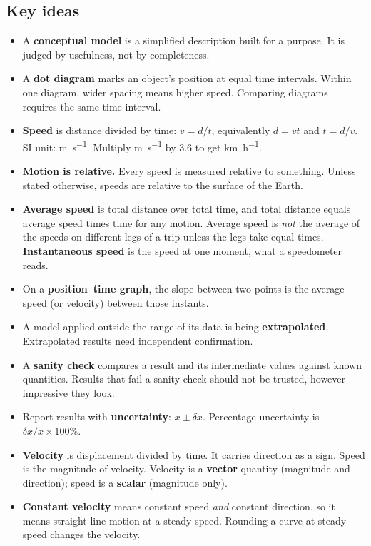 \documentclass[11pt,twoside,openany]{book}
\newcounter{check}[chapter]
\begin{document}
\subsection*{Key ideas}
\begin{itemize}
  \item A \textbf{conceptual model} is a simplified description built for a purpose. It is judged by usefulness, not by completeness.
  \item A \textbf{dot diagram} marks an object's position at equal time intervals. Within one diagram, wider spacing means higher speed. Comparing diagrams requires the same time interval.
  \item \textbf{Speed} is distance divided by time: $v = d/t$, equivalently $d = vt$ and $t = d/v$. SI unit: \si{\metre\per\second}. Multiply \si{\metre\per\second} by \num{3.6} to get \si{\kilo\metre\per\hour}.
  \item \textbf{Motion is relative.} Every speed is measured relative to something. Unless stated otherwise, speeds are relative to the surface of the Earth.
  \item \textbf{Average speed} is total distance over total time, and total distance equals average speed times time for any motion. Average speed is \emph{not} the average of the speeds on different legs of a trip unless the legs take equal times. \textbf{Instantaneous speed} is the speed at one moment, what a speedometer reads.
  \item On a \textbf{position--time graph}, the slope between two points is the average speed (or velocity) between those instants.
  \item A model applied outside the range of its data is being \textbf{extrapolated}. Extrapolated results need independent confirmation.
  \item A \textbf{sanity check} compares a result and its intermediate values against known quantities. Results that fail a sanity check should not be trusted, however impressive they look.
  \item Report results with \textbf{uncertainty}: $x \pm \delta x$. Percentage uncertainty is $\delta x / x \times 100\%$.
  \item \textbf{Velocity} is displacement divided by time. It carries direction as a sign. Speed is the magnitude of velocity. Velocity is a \textbf{vector} quantity (magnitude and direction); speed is a \textbf{scalar} (magnitude only).
  \item \textbf{Constant velocity} means constant speed \emph{and} constant direction, so it means straight-line motion at a steady speed. Rounding a curve at steady speed changes the velocity.
\end{itemize}
\end{document}
